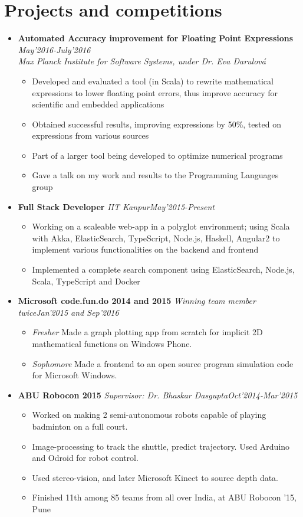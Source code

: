 \documentclass[11pt,a4paper]{moderncv}
\newcommand{\experience}[4]{
  \vspace{0.1cm}
\item \textbf{\large{#1}} \textit{#2}\hfill\textit{#3}
  \begin{itemize}[leftmargin=*]
    \setlength\itemsep{0em} #4
  \end{itemize}
}
\newcommand{\experiencetwo}[4]{
  \vspace{0.1cm}
\item \textbf{\large{#1}} \hfill\textit{#3}\\\textit{#2}
  \begin{itemize}[leftmargin=*]
    \setlength\itemsep{0em} #4
  \end{itemize}
}
\begin{document}
\vspace{-0.1cm}
\section*{Projects and competitions}
\begin{itemize}
  \setlength\itemsep{0.5em}
  \experiencetwo{Automated Accuracy improvement for Floating Point Expressions}{Max Planck Institute for Software
    Systems, under Dr. Eva Darulová}{May'2016-July'2016}{
    \item Developed and evaluated a tool (in Scala) to rewrite
      mathematical expressions to lower floating point errors, thus
      improve accuracy for scientific and embedded applications
    \item Obtained successful results, improving expressions by 50\%,
      tested on expressions from various sources
    \item Part of a larger tool being developed to optimize numerical
      programs
    \item Gave a talk on my work and results to the Programming Languages group
  }
  
  \experience{Full Stack Developer}{IIT Kanpur}{May'2015-Present}{
  \item Working on a scaleable web-app in a polyglot environment;
    using Scala with Akka, ElasticSearch, TypeScript, Node.js,
    Haskell, Angular2 to implement various functionalities on the
    backend and frontend
  \item Implemented a complete search component using
    ElasticSearch, Node.js, Scala, TypeScript and Docker
  }

  \experience{Microsoft code.fun.do 2014 and 2015}{Winning team member twice}{Jan'2015 and Sep'2016}{
  \item \textit{Fresher} Made a graph plotting app from scratch for implicit 2D mathematical functions on Windows Phone.
  \item \textit{Sophomore} Made a frontend to an open source program simulation code for Microsoft Windows.
  }

  \experience{ABU Robocon 2015}{Supervisor: Dr. Bhaskar Dasgupta}{Oct'2014-Mar'2015}{
  \item Worked on making 2 semi-autonomous robots capable of playing badminton on a full court.
  \item Image-processing to track the shuttle, predict trajectory. Used Arduino and Odroid for robot control.
  \item Used stereo-vision, and later Microsoft Kinect to source depth
    data.
  \item Finished 11th among 85 teams from all over India, at ABU Robocon
    '15, Pune
  }


\end{itemize}
\end{document}
